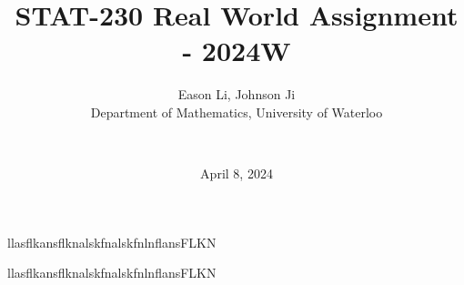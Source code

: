 \documentclass[final]{beamer}
\title{STAT-230 Real World Assignment - 2024W}
\author{
    Eason Li, Johnson Ji \\
    Department of Mathematics, University of Waterloo \and \\
}
\date{April 8, 2024} %
\begin{document}
\maketitle


\begin{minipage}{.5\textwidth}
    llasflkansflknalskfnalskfnlnflansFLKN
\end{minipage} 

\begin{minipage}{0.5\textwidth}
    llasflkansflknalskfnalskfnlnflansFLKN
\end{minipage}
\end{document}
